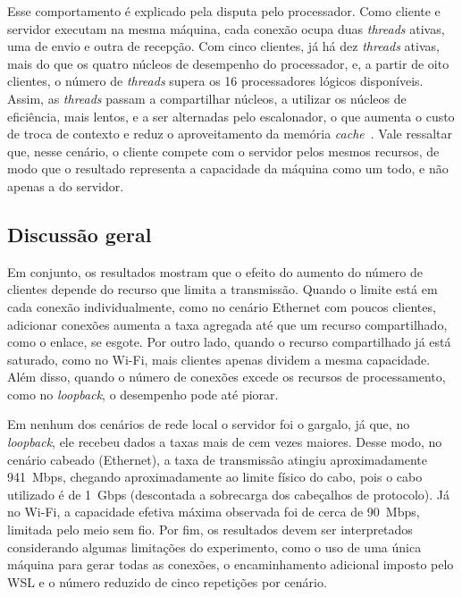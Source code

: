 \documentclass[12pt]{article}
\begin{document}
Esse comportamento é explicado pela disputa pelo processador. Como cliente e
servidor executam na mesma máquina, cada conexão ocupa duas \textit{threads}
ativas, uma de envio e outra de recepção. Com cinco clientes, já há dez
\textit{threads} ativas, mais do que os quatro núcleos de desempenho do
processador, e, a partir de oito clientes, o número de \textit{threads} supera
os 16 processadores lógicos disponíveis. Assim, as \textit{threads} passam a
compartilhar núcleos, a utilizar os núcleos de eficiência, mais lentos, e a ser
alternadas pelo escalonador, o que aumenta o custo de troca de contexto e reduz
o aproveitamento da memória \textit{cache}~\cite{kerrisk:10}. Vale ressaltar que, nesse cenário,
o cliente compete com o servidor pelos mesmos recursos, de modo que o resultado
representa a capacidade da máquina como um todo, e não apenas a do servidor.

\subsection{Discussão geral}

Em conjunto, os resultados mostram que o efeito do aumento do número de
clientes depende do recurso que limita a transmissão. Quando o limite está em
cada conexão individualmente, como no cenário Ethernet com poucos clientes,
adicionar conexões aumenta a taxa agregada até que um recurso compartilhado,
como o enlace, se esgote. Por outro lado, quando o recurso compartilhado já
está saturado, como no Wi-Fi, mais clientes apenas dividem a mesma capacidade.
Além disso, quando o número de conexões excede os recursos de processamento,
como no \textit{loopback}, o desempenho pode até piorar.

Em nenhum dos cenários de rede local o servidor foi o gargalo, já que, no
\textit{loopback}, ele recebeu dados a taxas mais de cem vezes maiores. Desse
modo, no cenário cabeado (Ethernet), a taxa de transmissão atingiu
aproximadamente 941~Mbps, chegando aproximadamente ao limite físico do cabo,
pois o cabo utilizado é de 1~Gbps (descontada a sobrecarga dos cabeçalhos de
protocolo). Já no Wi-Fi, a capacidade efetiva máxima observada foi de cerca de
90~Mbps, limitada pelo meio sem fio. Por fim, os resultados
devem ser interpretados considerando algumas limitações do experimento, como o
uso de uma única máquina para gerar todas as conexões, o encaminhamento
adicional imposto pelo WSL e o número reduzido de cinco repetições por cenário.




\end{document}
